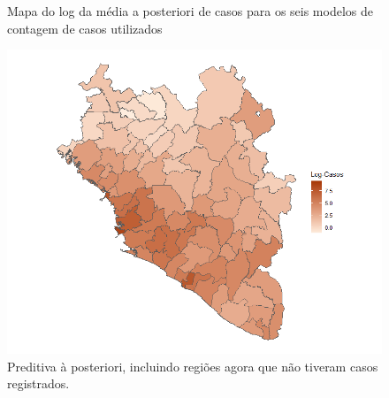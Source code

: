 \begin{figure}
\caption{Mapa do log da média a posteriori de casos para os seis modelos de contagem de casos utilizados} \label{fig:ebola_posterior_maps}
\end{figure}

\begin{figure}
    \centering
    \includegraphics[width = 0.8\linewidth]{images/posterior_predicitve_bym2.png}
    \caption{Preditiva à posteriori, incluindo regiões agora que não tiveram casos registrados.}
    \label{fig:pred}
\end{figure}